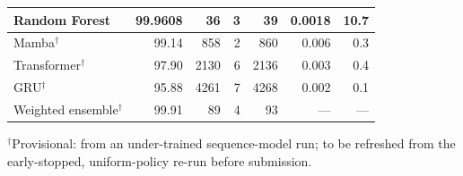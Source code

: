 \begin{table}[htbp]
\begin{tabular}{lrrrrrr}
Random Forest            & 99.9608 & 36   & 3   & 39          & 0.0018 & 10.7\\
\midrule
Mamba$^{\dagger}$        & 99.14   & 858  & 2   & 860         & 0.006  & 0.3\\
Transformer$^{\dagger}$  & 97.90   & 2130 & 6   & 2136        & 0.003  & 0.4\\
GRU$^{\dagger}$          & 95.88   & 4261 & 7   & 4268        & 0.002  & 0.1\\
Weighted ensemble$^{\dagger}$ & 99.91 & 89 & 4 & 93          & ---    & ---\\
\bottomrule
\end{tabular}

\vspace{2pt}
{\footnotesize $^{\dagger}$Provisional: from an under-trained sequence-model run;
to be refreshed from the early-stopped, uniform-policy re-run before submission.}
\end{table}
